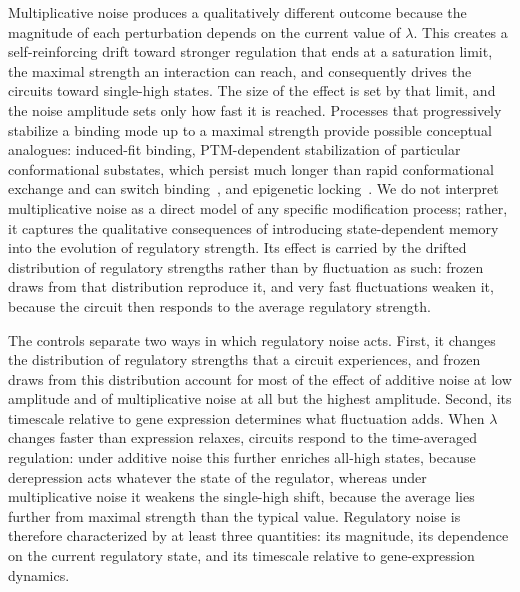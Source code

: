 \documentclass[11pt]{article}
\begin{document}
Multiplicative noise produces a qualitatively different outcome because the magnitude of each perturbation depends on the current value of $\lambda$. This creates a self-reinforcing drift toward stronger regulation that ends at a saturation limit, the maximal strength an interaction can reach, and consequently drives the circuits toward single-high states. The size of the effect is set by that limit, and the noise amplitude sets only how fast it is reached. Processes that progressively stabilize a binding mode up to a maximal strength provide possible conceptual analogues: induced-fit binding, PTM-dependent stabilization of particular conformational substates, which persist much longer than rapid conformational exchange and can switch binding~\cite{Kulkarni2022, Kulkarni2019, Bah2015Folding}, and epigenetic locking~\cite{Jia2019}. We do not interpret multiplicative noise as a direct model of any specific modification process; rather, it captures the qualitative consequences of introducing state-dependent memory into the evolution of regulatory strength. Its effect is carried by the drifted distribution of regulatory strengths rather than by fluctuation as such: frozen draws from that distribution reproduce it, and very fast fluctuations weaken it, because the circuit then responds to the average regulatory strength.

The controls separate two ways in which regulatory noise acts. First, it changes the distribution of regulatory strengths that a circuit experiences, and frozen draws from this distribution account for most of the effect of additive noise at low amplitude and of multiplicative noise at all but the highest amplitude. Second, its timescale relative to gene expression determines what fluctuation adds. When $\lambda$ changes faster than expression relaxes, circuits respond to the time-averaged regulation: under additive noise this further enriches all-high states, because derepression acts whatever the state of the regulator, whereas under multiplicative noise it weakens the single-high shift, because the average lies further from maximal strength than the typical value. Regulatory noise is therefore characterized by at least three quantities: its magnitude, its dependence on the current regulatory state, and its timescale relative to gene-expression dynamics.
\end{document}
